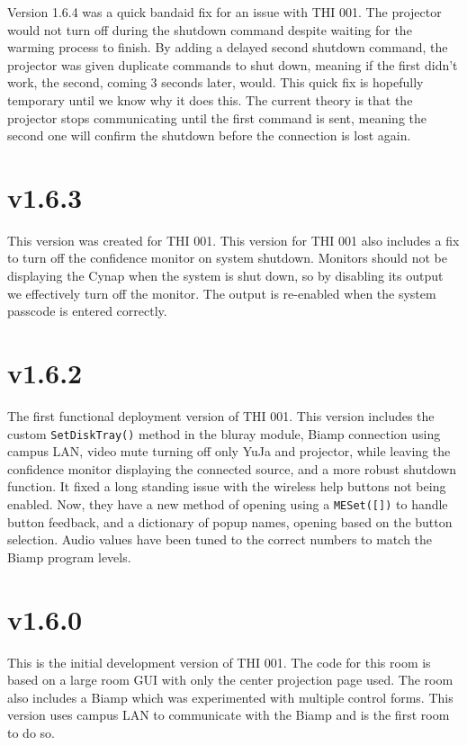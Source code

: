 \documentclass{article}
\begin{document}
Version 1.6.4 was a quick bandaid fix for an issue with THI 001. The projector would not turn off during the shutdown command
despite waiting for the warming process to finish. By adding a delayed second shutdown command, the projector was given 
duplicate commands to shut down, meaning if the first didn't work, the second, coming 3 seconds later, would. This quick fix 
is hopefully temporary until we know why it does this. The current theory is that the projector stops communicating until the 
first command is sent, meaning the second one will confirm the shutdown before the connection is lost again. 

\section*{v1.6.3}

This version was created for THI 001. This version for THI 001 also includes a fix to turn off the confidence monitor 
on system shutdown. Monitors should not be displaying the Cynap when the system is shut down, so by disabling its output we 
effectively turn off the monitor. The output is re-enabled when the system passcode is entered correctly. 

\section*{v1.6.2}

The first functional deployment version of THI 001. This version includes the custom \lstinline|SetDiskTray()| method in 
the bluray module, Biamp connection using campus LAN, video mute turning off only YuJa and projector, while leaving the 
confidence monitor displaying the connected source, and a more robust shutdown function. It fixed a long standing issue 
with the wireless help buttons not being enabled. Now, they have a new method of opening using a \lstinline|MESet([])| 
to handle button feedback, and a dictionary of popup names, opening based on the button selection. Audio values have been 
tuned to the correct numbers to match the Biamp program levels. 

\section*{v1.6.0}

This is the initial development version of THI 001. The code for this room is based on a large room GUI with only the center 
projection page used. The room also includes a Biamp which was experimented with multiple control forms. This version uses
campus LAN to communicate with the Biamp and is the first room to do so.
\end{document}
